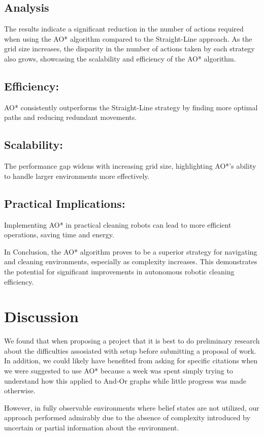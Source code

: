 \documentclass{article}
\begin{document}
\subsection{Analysis}
The results indicate a significant reduction in the number of actions required when using the AO* algorithm compared to the Straight-Line approach. As the grid size increases, the disparity in the number of actions taken by each strategy also grows, showcasing the scalability and efficiency of the AO* algorithm.

\subsection{Efficiency:} AO* consistently outperforms the Straight-Line strategy by finding more optimal paths and reducing redundant movements.
\subsection{Scalability:} The performance gap widens with increasing grid size, highlighting AO*'s ability to handle larger environments more effectively.
\subsection{Practical Implications:} Implementing AO* in practical cleaning robots can lead to more efficient operations, saving time and energy.


In Conclusion, the AO* algorithm proves to be a superior strategy for navigating and cleaning environments, especially as complexity increases. This demonstrates the potential for significant improvements in autonomous robotic cleaning efficiency.


\section{Discussion}
We found that when proposing a project that it is best to do preliminary research about the difficulties assosiated with setup before submitting a proposal of work. In addition, we could likely have benefited from asking for specific citations when we were suggested to use AO* because a week was spent simply trying to understand how this applied to And-Or graphs while little progress was made otherwise. 

However, in fully observable environments where belief states are not utilized, our approach performed admirably due to the absence of complexity introduced by uncertain or partial information about the environment.
\end{document}
